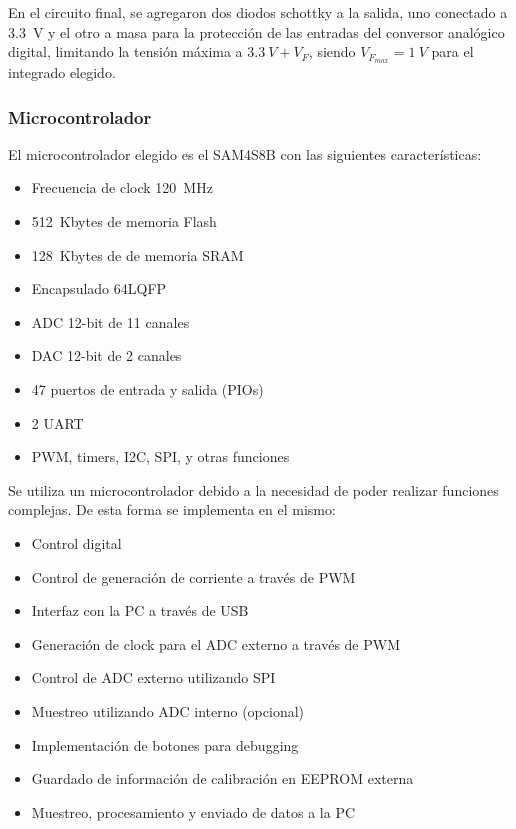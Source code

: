 \documentclass[titlepage, 12pt]{article}
\begin{document}
En el circuito final, se agregaron dos diodos schottky a la salida, uno conectado a \SI{3.3}{V} y el otro a masa para la protección de las entradas del conversor analógico digital, limitando la tensión máxima a $\SI{3.3}{V} + V_F$, siendo $V_{F_{max}} = \SI{1}{V}$ para el integrado elegido.

\subsubsection{Microcontrolador}
El microcontrolador elegido es el SAM4S8B con las siguientes características:
    \begin{itemize}
        \item Frecuencia de clock \SI{120}{MHz}
        \item \SI{512}{Kbytes} de memoria Flash
        \item \SI{128}{Kbytes} de de memoria SRAM
        \item Encapsulado 64LQFP
        \item ADC 12-bit de 11 canales
        \item DAC 12-bit de 2 canales
        \item 47 puertos de entrada y salida (PIOs)
        \item 2 UART
        \item PWM, timers, I2C, SPI, y otras funciones
    \end{itemize}

Se utiliza un microcontrolador debido a la necesidad de poder realizar funciones complejas. De esta forma se implementa en el mismo:

    \begin{itemize}
        \item Control digital
        \item Control de generación de corriente a través de PWM
        \item Interfaz con la PC a través de USB
        \item Generación de clock para el ADC externo a través de PWM
        \item Control de ADC externo utilizando SPI
        \item Muestreo utilizando ADC interno (opcional)
        \item Implementación de botones para debugging
        \item Guardado de información de calibración en EEPROM externa
        \item Muestreo, procesamiento y enviado de datos a la PC
    \end{itemize}
\end{document}
